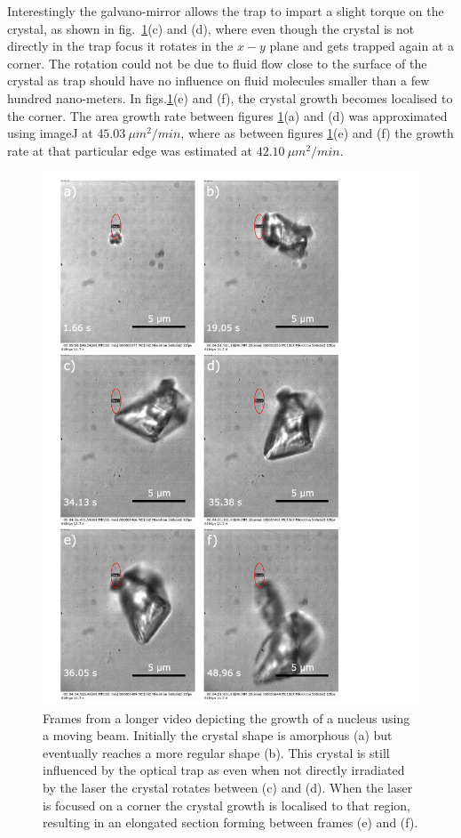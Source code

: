 Interestingly the galvano-mirror allows the trap to impart a slight torque 
on the crystal, as shown in fig.~\ref{fig:eliptical_beam_1}(c) and (d), 
where even though the crystal is not directly in the trap focus it rotates 
in the $x-y$ plane and gets trapped again at a corner. The rotation could 
not be due to fluid flow close to the surface of the crystal as trap should 
have no influence on fluid molecules smaller than a few hundred nano-meters. 
In figs.\ref{fig:eliptical_beam_1}(e) and (f), the crystal growth becomes 
localised to the corner. The area growth rate between figures \ref{fig:eliptical_beam_1}(a) and (d) was approximated using imageJ at $45.03\ 
\mu m^2 /min$, where as between figures \ref{fig:eliptical_beam_1}(e) and 
(f) the growth rate at that particular edge was estimated at $42.10\ \mu m^2/min$. 
\begin{figure}[h!]
	\centering
	\includegraphics[width=0.85\linewidth]{frames_eliptical_beam.pdf}
	\caption{Frames from a longer video depicting the growth of a nucleus using 
		a moving beam. Initially the crystal shape is amorphous (a) but eventually
		reaches a more regular shape (b). This crystal is still influenced by the
		optical trap as even when not directly irradiated by the laser the crystal
		rotates between (c) and (d). When the laser is focused on a corner the 
		crystal growth is localised to that region, resulting in an elongated 
		section forming between frames (e) and (f).}
	\label{fig:eliptical_beam_1}
\end{figure}
 
